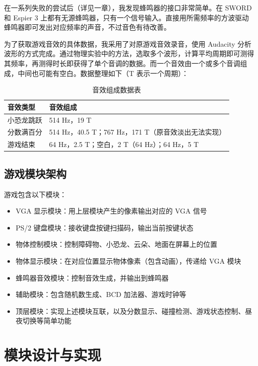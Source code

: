 \documentclass[hyperref,UTF8,12pt,a4paper]{ctexart}
\providecommand{\tightlist}{%
  \setlength{\itemsep}{0pt}\setlength{\parskip}{0pt}}
\begin{document}
在一系列失败的尝试后（详见一章），我发现蜂鸣器的接口非常简单。在
SWORD 和 Espier 3
上都有无源蜂鸣器，只有一个信号输入。直接用所需频率的方波驱动蜂鸣器即可发出对应频率的声音，不过音色有待改善。

为了获取游戏音效的具体数据，我采用了对原游戏音效录音，使用 Audacity
分析波形的方式完成。通过物理实验中的方法，选取多个波形，计算平均周期即可测得其频率，再测得时长即获得了单个音调的数据。而一个音效由一个或多个音调组成，中间也可能有空白。数据整理如下（T
表示一个周期）：

\begin{longtable}[]{@{}ll@{}}
\caption{音效组成数据表}\tabularnewline
\toprule
音效类型 & 音效组成 \\
\midrule
\endhead
小恐龙跳跃 & 514 Hz，19 T \\
分数满百分 & 514 Hz，40.5 T；767 Hz，171 T（原音效淡出无法实现） \\
游戏结束 & 64 Hz，2.5 T；空白，2 T（64 Hz）；64 Hz，5 T \\
\bottomrule
\end{longtable}

\hypertarget{ux6e38ux620fux6a21ux5757ux67b6ux6784}{%
\subsection{游戏模块架构}\label{ux6e38ux620fux6a21ux5757ux67b6ux6784}}

游戏包含以下模块：

\begin{itemize}
\tightlist
\item
  VGA 显示模块：用上层模块产生的像素输出对应的 VGA 信号
\item
  PS/2 键盘模块：接收键盘按键扫描码，输出当前按键状态
\item
  物体控制模块：控制障碍物、小恐龙、云朵、地面在屏幕上的位置
\item
  物体显示模块：在对应位置显示物体像素（包含动画），传递给 VGA 模块
\item
  蜂鸣器音效模块：控制音效生成，并输出到蜂鸣器
\item
  辅助模块：包含随机数生成、BCD 加法器、游戏时钟等
\item
  顶层模块：实现上述模块互联，以及分数显示、碰撞检测、游戏状态控制、昼夜切换等简单功能
\end{itemize}

\hypertarget{ux6a21ux5757ux8bbeux8ba1ux4e0eux5b9eux73b0}{%
\section{模块设计与实现}\label{ux6a21ux5757ux8bbeux8ba1ux4e0eux5b9eux73b0}}
\end{document}
